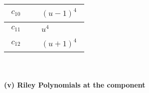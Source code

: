 \documentclass[1p]{elsarticle_modified}
\theoremstyle{definition}
\begin{document}
\begin{tabular}{m{50pt}|m{274pt}}
\hline $$\begin{aligned}c_{10}\end{aligned}$$&$\begin{aligned}
&(u-1)^4
\end{aligned}$\\
\hline $$\begin{aligned}c_{11}\end{aligned}$$&$\begin{aligned}
&u^4
\end{aligned}$\\
\hline $$\begin{aligned}c_{12}\end{aligned}$$&$\begin{aligned}
&(u+1)^4
\end{aligned}$\\
\hline
\end{tabular}\\~\\
\newpage\renewcommand{\arraystretch}{1}
\flushleft \textbf{(v) Riley Polynomials at the component}\newline \\
\end{document}
